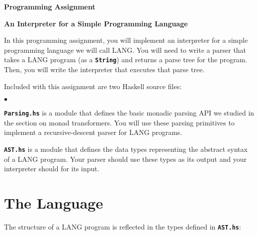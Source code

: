 \documentclass[12pt]{article}
\newcommand\code[1]{\texttt{\textbf{#1}}}
\newenvironment{notelist}{\begin{list}
   {$\bullet$}
   {\setlength{\itemsep}{0in}}}
   {\end{list}}
\begin{document}
\thispagestyle{empty}

\begingroup
    \centering
    \LARGE \textbf{Programming Assignment} \par
    \large \textbf{An Interpreter for a Simple Programming Language} \par
\endgroup

In this programming assignment, you will implement an interpreter for a simple programming language we will call LANG.
You will need to write a parser that takes a LANG program (as a \code{String}) and returns a parse tree for the program.
Then, you will write the interpreter that executes that parse tree.

Included with this assignment are two Haskell source files: 

\begin{notelist}
    \item \code{Parsing.hs} is a module that defines the basic monadic parsing API we studied in the section on
          monad transformers. You will use these parsing primitives to implement a recursive-descent parser for
          LANG programs.
    \item \code{AST.hs} is a module that defines the data types representing the abstract syntax of a LANG program.
          Your parser should use these types as its output and your interpreter should for its input.
\end{notelist}

\section{The Language}

The structure of a LANG program is reflected in the types defined in \code{AST.hs}:
\end{document}
